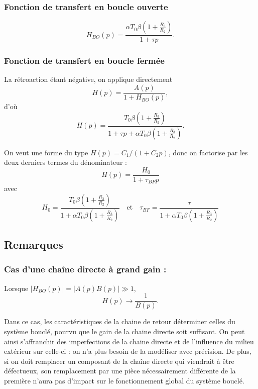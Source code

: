 \documentclass[11pt,a4paper]{report}
\begin{document}
\subsubsection{Fonction de transfert en boucle ouverte}

\begin{equation}
	 \boxed{H_{BO}(p) = \frac{\alpha T_0\beta\left(1+\frac{R_3}{R_2}\right)}{1+\tau p}}.
\end{equation}

\subsubsection{Fonction de transfert en boucle fermée}

La rétroaction étant négative, on applique directement 
\begin{equation}
	H(p) = \frac{A(p)}{1+H_{BO}(p)},
\end{equation}
d'où
\begin{equation}
	H(p) = \frac{T_0 \beta\left(1+\frac{R_3}{R_2}\right)}{1 + \tau p + \alpha T_0 \beta\left(1+\frac{R_3}{R_2}\right)}. 
\end{equation}

On veut une forme du type $H(p) = C_1/(1 + C_2 p)$, donc on factorise par les deux derniers termes du dénominateur :
\begin{equation}
	 \boxed{H(p) = \frac{H_0}{1 + \tau_{BF} p}}
\end{equation}
avec
\begin{equation}
	H_0 =  \frac{T_0 \beta\left(1+\frac{R_3}{R_2}\right)}{1+\alpha T_0 \beta\left(1+\frac{R_3}{R_2}\right)} \quad\text{et}\quad
	\tau_{BF} = \frac{\tau}{1 + \alpha T_0 \beta \left(1 + \frac{R_3}{R_2}\right)}
\end{equation}

\subsection{Remarques}

\subsubsection{Cas d'une chaîne directe à grand gain :}

Lorsque $|H_{BO}(p)| = |A(p)B(p)| \gg 1$, 
\begin{equation}
	H(p) \longrightarrow \frac{1}{B(p)}.
\end{equation}

Dans ce cas, les caractéristiques de la chaine de retour déterminer celles du système bouclé, pourvu que le gain de la chaine directe soit suffisant. On peut ainsi s'affranchir des imperfections de la chaine directe et de l'influence du milieu extérieur sur celle-ci : on n'a plus besoin de la modéliser avec précision. De plus, si on doit remplacer un composant de la chaîne directe qui viendrait à être défectueux, son remplacement par une pièce nécessairement différente de la première n'aura pas d'impact sur le fonctionnement global du système bouclé.
\end{document}
